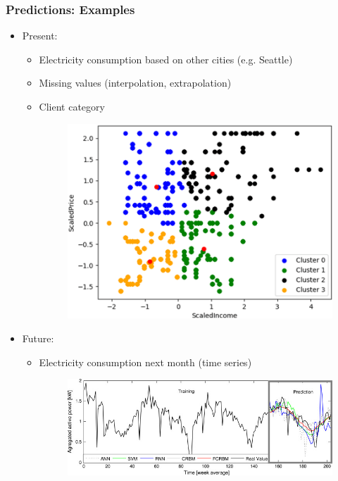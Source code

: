 \begin{frame}\frametitle{Predictions: Examples}
   \begin{itemize}
      \item Present:
      \begin{itemize}
         \item Electricity consumption based on other cities (e.g. Seattle)
         \item Missing values (interpolation, extrapolation)
         \item Client category
         \begin{minipage}{0.6\linewidth}
            \begin{figure}[H]
               \includegraphics[scale=.1]{../images/illustrations/model_client.png}
            \end{figure}
         \end{minipage}
      \end{itemize}
      \item Future:
      \begin{itemize}
         \item Electricity consumption next month (time series)
         \begin{minipage}{0.60\linewidth}
            \begin{figure}[H]
               \includegraphics[scale=.35]{../images/illustrations/model_electricity.jpg}

\end{figure}
\end{minipage}
\end{itemize}
\end{itemize}
\end{frame}
